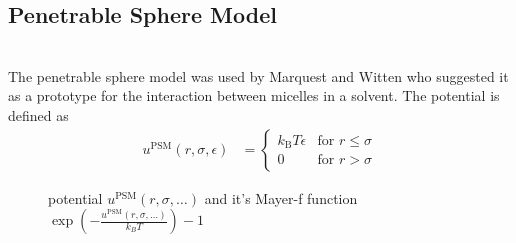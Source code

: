 \newpage
\subsection{Penetrable Sphere Model}
~\\

The penetrable sphere model was used by Marquest and
Witten \cite{Marquest1989} who suggested it as a prototype for the interaction between micelles in a solvent.
The potential is defined as \cite{Marquest1989,Viererblova2010}
\begin{align}
u^\text{PSM}(r,\sigma,\epsilon) &=
\begin{cases}
k_\text{B} T \epsilon   & \mbox{for } r \leq \sigma \\
0                       & \mbox{for } r >    \sigma
\end{cases}
\end{align}

\begin{figure}[htb]
\captionsetup[subfigure]{position=b}
\centering
{}
\hfill
{}
\caption{potential $u^\text{PSM}(r,\sigma,\ldots)$ and it's Mayer-f function $\exp\left(-\frac{u^\text{PSM}(r,\sigma,\ldots)}{k_BT}\right)-1$}
\end{figure}

